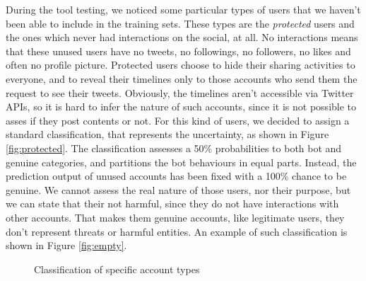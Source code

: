 During the tool testing, we noticed some particular types of users that we haven't been able to include in the training sets. These types are the \textit{protected} users and the ones which never had interactions on the social, at all. No interactions means that these unused users have no tweets, no followings, no followers, no likes and often no profile picture.
Protected users choose to hide their sharing activities to everyone, and to reveal their timelines only to those accounts who send them the request to see their tweets. Obviously, the timelines aren't accessible via Twitter APIs, so it is hard to infer the nature of such accounts, since it is not possible to asses if they post contents or not. For this kind of users, we decided to assign a standard classification, that represents the uncertainty, as shown in Figure \ref{fig:protected}. The classification assesses a 50\% probabilities to both bot and genuine categories, and partitions the bot behaviours in equal parts.
Instead, the prediction output of unused accounts has been fixed with a 100\% chance to be genuine. We cannot assess the real nature of those users, nor their purpose, but we can state that their not harmful, since they do not have interactions with other accounts. That makes them genuine accounts, like legitimate users, they don't represent threats or harmful entities. An example of such classification is shown in Figure \ref{fig:empty}.

\begin{figure}[htp!]
	\centering 
	\caption{Classification of specific account types}
\end{figure}
